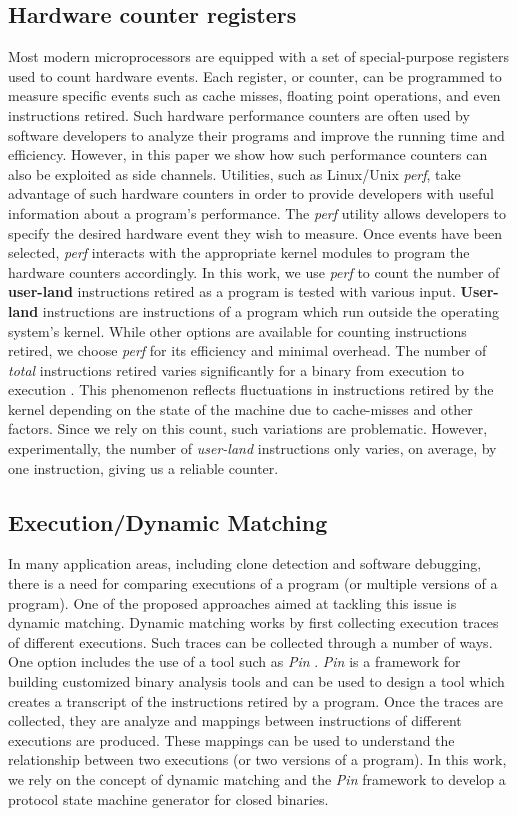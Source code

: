 \documentclass{acm_proc_article-sp}
\begin{document}
\subsection{Hardware counter registers} \label{bg_hardwarereg}
Most modern microprocessors are equipped with a set of special-purpose registers used to count hardware events.
Each register, or counter, can be programmed to measure specific events such as cache misses, floating point operations, and even instructions retired.
Such hardware performance counters are often used by software developers to analyze their programs and improve the running time and efficiency.
However, in this paper we show how such performance counters can also be exploited as side channels.
Utilities, such as Linux/Unix \textit{perf}, take advantage of such hardware counters in order to provide developers with useful information about a program's performance.
The \textit{perf} utility allows developers to specify the desired hardware event they wish to measure.
Once events have been selected, \textit{perf} interacts with the appropriate kernel modules to program the hardware counters accordingly.
In this work, we use \textit{perf} to count the number of \textbf{user-land} instructions retired as a program is tested with various input.
\textbf{User-land} instructions are instructions of a program which run outside the operating system's kernel.
While other options are available for counting instructions retired, we choose \textit{perf} for its efficiency and minimal overhead.
The number of \textit{total} instructions retired varies significantly for a binary from execution to execution \cite{weaver2008can}.
This phenomenon reflects fluctuations in instructions retired by the kernel depending on the state of the machine due to cache-misses and other factors.
Since we rely on this count, such variations are problematic.
However, experimentally, the number of \textit{user-land} instructions only varies, on average, by one instruction, giving us a reliable counter.
\subsection{Execution/Dynamic Matching} \label{bg_dynamicsim}
In many application areas, including clone detection and software debugging, there is a need for comparing executions of a program (or multiple versions of a program).
One of the proposed approaches aimed at tackling this issue is dynamic matching.
Dynamic matching works by first collecting execution traces of different executions.
Such traces can be collected through a number of ways.
One option includes the use of a tool such as \textit{Pin} \cite{pintool}.
\textit{Pin} is a framework for building customized binary analysis tools and can be used to design a tool which creates a transcript of the instructions retired by a program.
Once the traces are collected, they are analyze and mappings between instructions of different executions are produced.
These mappings can be used to understand the relationship between two executions (or two versions of a program).
In this work, we rely on the concept of dynamic matching and the \textit{Pin} framework to develop a protocol state machine generator for closed binaries.
\end{document}
